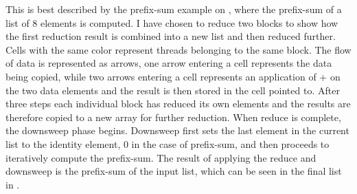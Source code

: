 This is best described by the prefix-sum example on , where
the prefix-sum of a list of 8 elements is computed. I have chosen to reduce two
blocks to show how the first reduction result is combined into a new list and
then reduced further. Cells with the same color represent threads belonging to
the same block. The flow of data is represented as arrows, one arrow entering a
cell represents the data being copied, while two arrows entering a cell
represents an application of + on the two data elements and the result is then
stored in the cell pointed to. After three steps each individual block has
reduced its own elements and the results are therefore copied to a new array for
further reduction. When reduce is complete, the downsweep phase
begins. Downsweep first sets the last element in the current list to the
identity element, 0 in the case of prefix-sum, and then proceeds to iteratively
compute the prefix-sum. The result of applying the reduce and downsweep is the
prefix-sum of the input list, which can be seen in the final list in
.





 
\newcommand{\drawArray}[4]{
  \draw (#1,#2) -> (#3,#2);
  \draw (#1,#4) -> (#3,#4);
  \foreach \x in {#1,...,#3} \draw (\x,#2) -> (\x,#4);
}

